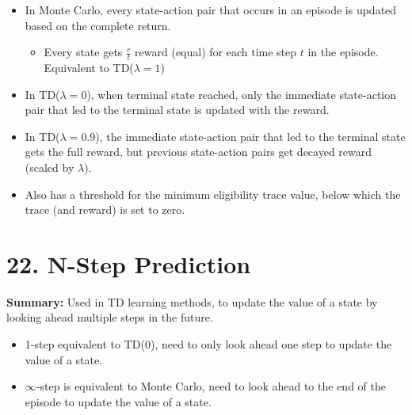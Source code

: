 \documentclass[letterpaper,10pt]{article}
\begin{document}
\begin{multicols}{2}
\begin{itemize}
    \item In Monte Carlo, every state-action pair that occurs in an episode is updated based on the complete return.
    \begin{itemize}
        \item Every state gets \( \frac{r}{t} \) reward (equal) for each time step \( t \) in the episode. Equivalent to TD(\( \lambda=1 \))
    \end{itemize}
    \item In TD(\( \lambda=0 \)), when terminal state reached, only the immediate state-action pair that led to the terminal state is updated with the reward.
    \item In TD(\( \lambda=0.9 \)), the immediate state-action pair that led to the terminal state gets the full reward, but previous state-action pairs get decayed reward (scaled by \( \lambda \)).
    \item Also has a threshold for the minimum eligibility trace value, below which the trace (and reward) is set to zero.
\end{itemize}

\section*{22. N-Step Prediction}
\textbf{Summary:} Used in TD learning methods, to update the value of a state by looking ahead multiple steps in the future.

\begin{itemize}
    \item 1-step equivalent to TD(0), need to only look ahead one step to update the value of a state.
    \item \( \infty \)-step is equivalent to Monte Carlo, need to look ahead to the end of the episode to update the value of a state.
\end{itemize}

\end{multicols}
\end{document}
